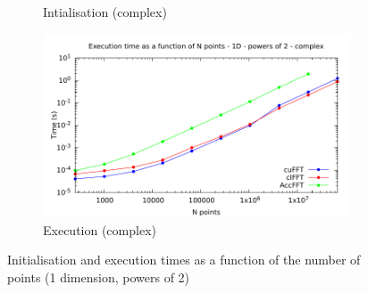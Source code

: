 \documentclass[12pt, a4paper]{article}
\begin{document}
\begin{figure}[H]
\begin{subfigure}{.5\textwidth}
\caption{Intialisation (complex)}
\label{FFTPOW21DCI}
\end{subfigure}%
\begin{subfigure}{.5\textwidth}
\centering
\includegraphics[width=.9\linewidth]{graphs/fft-1d-pow2-c-exec.pdf}
\caption{Execution (complex)}
\label{FFTPOW21DCE}
\end{subfigure}
\caption{Initialisation and execution times as a function of the number of points (1 dimension, powers of 2)}
\label{FFTPOW21D}
\end{figure}
\end{document}
